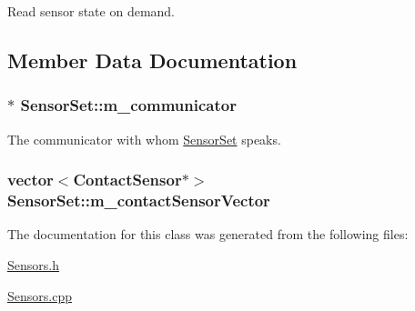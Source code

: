 Read sensor state on demand. 



\subsection{Member Data Documentation}
\hypertarget{classSensorSet_a9045b86488810de30e8a5b25fdb1128a}{
\subsubsection[{m\-\_\-communicator}]{$\ast$ Sensor\-Set\-::m\-\_\-communicator}}\label{classSensorSet_a9045b86488810de30e8a5b25fdb1128a}


The communicator with whom \hyperlink{classSensorSet}{Sensor\-Set} speaks. 

\hypertarget{classSensorSet_a2747d586c016d0fe34645f9ca07a08c6}{
\subsubsection[{m\-\_\-contact\-Sensor\-Vector}]{\setlength{\rightskip}{0pt plus 5cm}vector$<${\bf Contact\-Sensor}$\ast$$>$ Sensor\-Set\-::m\-\_\-contact\-Sensor\-Vector}}\label{classSensorSet_a2747d586c016d0fe34645f9ca07a08c6}


The documentation for this class was generated from the following files\-:\begin{DoxyCompactItemize}
\item 
\hyperlink{Sensors_8h}{Sensors.\-h}\item 
\hyperlink{Sensors_8cpp}{Sensors.\-cpp}\end{DoxyCompactItemize}

